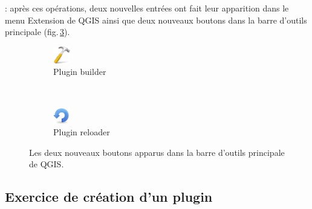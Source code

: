 \documentclass[11pt]{article}
\begin{document}

\underline{}: après ces opérations, deux nouvelles entrées ont fait leur apparition dans le menu \og{}Extension\fg{} de QGIS ainsi que deux nouveaux boutons dans la barre d'outils principale (fig.\,\ref{fig3}).


\begin{figure}[H]
    \centering
    \begin{subfigure}[t]{0.2\textwidth}
		\centering
        \includegraphics[width=2em]{pluginbuilder.png}
\caption{Plugin builder}\label{fig3:builder}
    \end{subfigure}%
    ~
    \begin{subfigure}[t]{0.2\textwidth}
        \centering
        \includegraphics[width=2em]{reload.png}
        \caption{Plugin reloader}\label{fig3:reloader}
    \end{subfigure}
    \caption{Les deux nouveaux boutons apparus dans la barre d'outils principale de QGIS.}
    \label{fig3}
\end{figure}




\subsection{Exercice de création d'un plugin}
\label{CreationPlugin}
\end{document}
